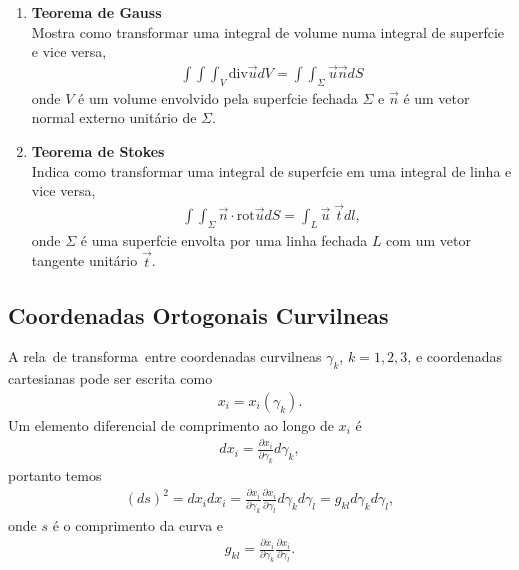 \begin{enumerate}
\item {\bf Teorema de Gauss}\\
Mostra como transformar uma integral de volume numa integral de
superf\ih cie e vice versa,
\begin{eqnarray}
\int\!\!\!\int\!\!\!\int_{V}\mbox{div}\vec{u}dV = \int\!\!\!\int_{\Sigma}\vec{u}\! \vec{n}dS
\end{eqnarray}
onde $V$ \'e um volume envolvido pela superf\ih cie fechada
$\Sigma$ e $\vec{n}$ \'e um vetor normal externo unit\'ario de
$\Sigma$.

\item {\bf Teorema de Stokes}\\
Indica como transformar uma integral de superf\ih cie em uma
integral de linha e vice versa,
\begin{eqnarray}
\int\!\!\!\int_{\Sigma}\vec{n}\cdot\mbox{rot}\vec{u}dS = \int_{L}\vec{u}\; \vec{t}dl,
\end{eqnarray}
onde $\Sigma$ \'e uma superf\ih cie envolta por uma linha fechada
$L$ com um vetor tangente unit\'ario $\vec{t}$.

\end{enumerate}

\subsection {Coordenadas Ortogonais Curvil\ih neas}

A rela\cao\ de transforma\cao\ entre coordenadas curvil\ih neas
$\gamma_{k}$, $k = 1,2,3$, e coordenadas cartesianas pode ser
escrita como
\begin{eqnarray}
x_{i} = x_{i}(\gamma_{k}).
\end{eqnarray}
Um elemento diferencial de comprimento ao longo de $x_{i}$ \'e
\begin{eqnarray}
dx_{i} = \frac{\partial x_{i}}{\partial \gamma_{k}}d\gamma_{k},
\end{eqnarray}
portanto temos
\begin{eqnarray}
(ds)^{2} = dx_{i}dx_{i} = \frac{\partial x_{i}}{\partial
\gamma_{k}}\frac{\partial x_{i}}{\partial
\gamma_{l}}d\gamma_{k}d\gamma_{l} = g_{kl}d\gamma_{k}d\gamma_{l},
\end{eqnarray}
onde $s$ \'e o comprimento da curva e
\begin{eqnarray}
g_{kl} = \frac{\partial x_{i}}{\partial \gamma_{k}}\frac{\partial
x_{i}}{\partial \gamma_{l}}.
\end{eqnarray}

